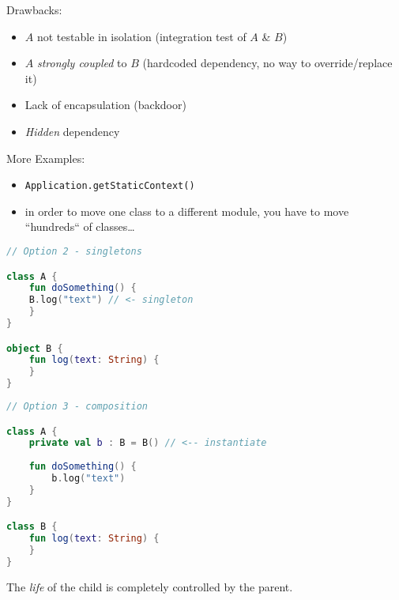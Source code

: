\documentclass[10pt]{beamer}
\begin{document}
	\begin{frame}[fragile]
		Drawbacks:
		\begin{itemize}
			\item $A$ not testable in isolation (integration test of $A$ \& $B$)
			\item $A$ \emph{strongly coupled} to $B$ (hardcoded dependency, no way to override/replace it) 
			\item Lack of encapsulation  (backdoor) 
			\item \emph{Hidden} dependency 
		\end{itemize}
	\end{frame}
	\begin{frame}[fragile]
		More Examples:
		\begin{itemize}
			\item \verb|Application.getStaticContext()|
			\item in order to move one class to a different module, you have to move ``hundreds`` of classes\ldots 
		\end{itemize}
	\end{frame}
\begin{frame}[fragile]
\begin{lstlisting}[language=Kotlin, basicstyle=\ttfamily]
// Option 2 - singletons

class A {
    fun doSomething() {
	B.log("text") // <- singleton
    }
}

object B {
    fun log(text: String) {
    }
}
\end{lstlisting} 
\end{frame}
\begin{frame}[fragile]
\begin{lstlisting}[language=Kotlin, basicstyle=\ttfamily]
// Option 3 - composition 

class A {
    private val b : B = B() // <-- instantiate
    
    fun doSomething() {
        b.log("text")
    }
}

class B {
    fun log(text: String) {
    }
}
\end{lstlisting} 
\end{frame}
	\begin{frame}[fragile]
		\begin{figure}
			\centering
{}
		\end{figure}
			The \emph{life} of the child is completely controlled by the parent.
	\end{frame}
\end{document}
